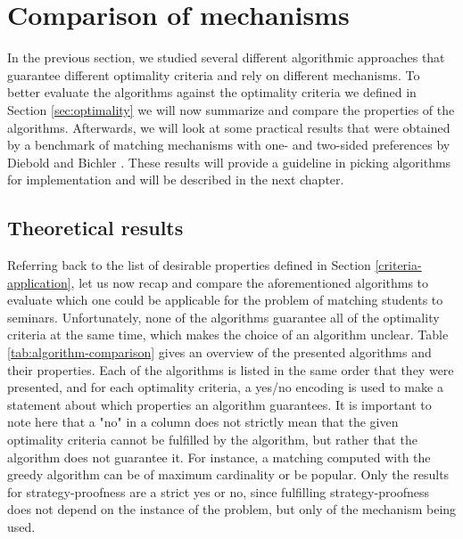 \section{Comparison of mechanisms}
In the previous section, we studied several different algorithmic approaches that guarantee different optimality criteria and rely on different mechanisms. To better evaluate the algorithms against the optimality criteria we defined in Section \ref{sec:optimality} we will now summarize and compare the properties of the algorithms. Afterwards, we will look at some practical results that were obtained by a benchmark of matching mechanisms with one- and two-sided preferences by Diebold and Bichler \cite{DieboldBenchmark}. These results will provide a guideline in picking algorithms for implementation and will be described in the next chapter.

\subsection{Theoretical results}
Referring back to the list of desirable properties defined in Section \ref{criteria-application}, let us now recap and compare the aforementioned algorithms to evaluate which one could be applicable for the problem of matching students to seminars. Unfortunately, none of the algorithms guarantee all of the optimality criteria at the same time, which makes the choice of an algorithm unclear. Table \ref{tab:algorithm-comparison} gives an overview of the presented algorithms and their properties. Each of the algorithms is listed in the same order that they were presented, and for each optimality criteria, a yes/no encoding is used to make a statement about which properties an algorithm guarantees. It is important to note here that a "no" in a column does not strictly mean that the given optimality criteria cannot be fulfilled by the algorithm, but rather that the algorithm does not guarantee it. For instance, a matching computed with the greedy algorithm can be of maximum cardinality or be popular. Only the results for strategy-proofness are a strict yes or no, since fulfilling strategy-proofness does not depend on the instance of the problem, but only of the mechanism being used. 

